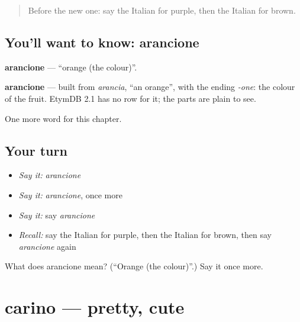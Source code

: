 \label{lesson:IT-C123-arancione}



\begin{quote}
Before the new one: say the Italian for purple, then the Italian for brown.
\end{quote}

\subsection*{You'll want to know: arancione}
\textbf{arancione} — \textquotedblleft{}orange (the colour)\textquotedblright{}.

\begin{cousinweb}
\textbf{arancione} — built from \emph{arancia}, \textquotedblleft{}an orange\textquotedblright{}, with the ending \emph{-one}: the colour of the fruit. EtymDB 2.1 has no row for it; the parts are plain to see.
\end{cousinweb}

\begin{grammarlens}[title={What you've built}]
One more word for this chapter.
\end{grammarlens}

\subsection*{Your turn}
\begin{itemize}
\raggedright
  \item \emph{Say it:} \emph{arancione}
  \item \emph{Say it:} \emph{arancione}, once more
  \item \emph{Say it:} say \emph{arancione}
  \item \emph{Recall:} say the Italian for purple, then the Italian for brown, then say \emph{arancione} again
\end{itemize}

\begin{tcolorbox}[breakable,colback=teal!4,colframe=teal!35!black,title={Before you move on}]
What does arancione mean? (\textquotedblleft{}Orange (the colour)\textquotedblright{}.) Say it once more.
\end{tcolorbox}
\section[carino]{carino — pretty, cute}

\label{lesson:IT-C123-carino}



